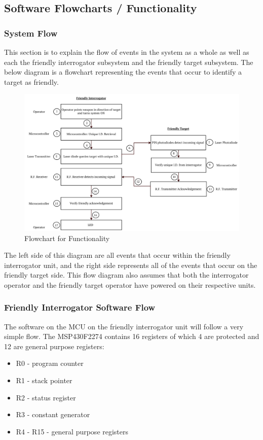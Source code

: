 \documentclass[letterpaper,10pt]{article}
\begin{document}
\begin{spacing}{1.15}
\subsection{Software Flowcharts / Functionality}
\subsubsection{System Flow}
This section is to explain the flow of events in the system as a whole as well as each the friendly interrogator subsystem and the friendly target subsystem. The below diagram is a flowchart representing the events that occur to identify a target as friendly.

\begin{figure} [H]
	\centering
	\includegraphics[scale=0.4]{Functional_Flowchart.png}
	\caption{Flowchart for Functionality\label{fig:circuit-schematic}}
\end{figure}

The left side of this diagram are all events that occur within the friendly interrogator unit, and the right side represents all of the events that occur on the friendly target side. This flow diagram also assumes that both the interrogator operator and the friendly target operator have powered on their respective units.

\subsubsection{Friendly Interrogator Software Flow}
The software on the MCU on the friendly interrogator unit will follow a very simple flow. The MSP430F2274 contains 16 registers of which 4 are protected and 12 are general purpose registers:
\begin{itemize}
	\item R0 - program counter
	\item R1 - stack pointer 
	\item R2 - status register
	\item R3 - constant generator
	\item R4 - R15 - general purpose registers
\end{itemize}


\end{spacing}
\end{document}
